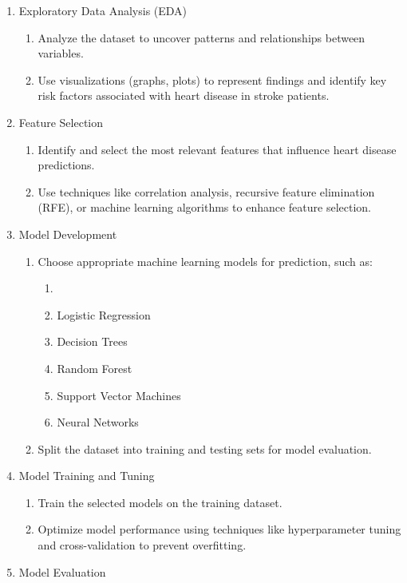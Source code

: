 \documentclass[runningheads]{llncs}
\begin{document}
\begin{enumerate}
\begin{enumerate}
    \end {enumerate}
\item  Exploratory Data Analysis (EDA)
    \begin{enumerate}
        \item Analyze the dataset to uncover patterns and relationships between variables. 
        \item Use visualizations (graphs, plots) to represent findings and identify key risk factors associated with heart disease in stroke patients. 
    \end{enumerate}
\item Feature Selection
\begin{enumerate}
    \item Identify and select the most relevant features that influence heart disease predictions. 
    \item Use techniques like correlation analysis, recursive feature elimination (RFE), or machine learning algorithms to enhance feature selection. 
\end{enumerate}
\item Model Development
    \begin{enumerate}
        \item Choose appropriate machine learning models for prediction, such as: 
            \begin{enumerate}
                \item \item Logistic Regression
                \item Decision Trees 
                \item Random Forest 
                \item Support Vector Machines 
                \item Neural Networks 
            \end{enumerate}
        \item Split the dataset into training and testing sets for model evaluation. 
    \end{enumerate}
\item Model Training and Tuning
    \begin{enumerate}
        \item Train the selected models on the training dataset. 
        \item Optimize model performance using techniques like hyperparameter tuning and cross-validation to prevent overfitting. 
    \end{enumerate}
\item Model Evaluation

\end{enumerate}
\end{document}
